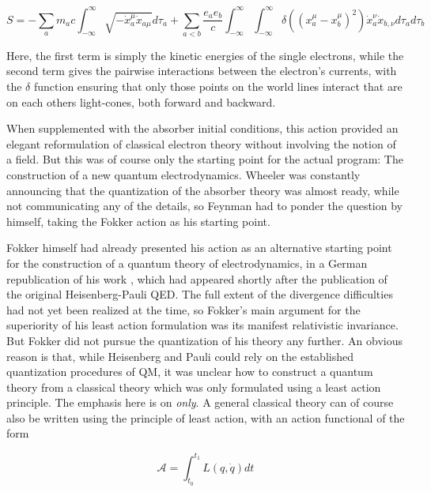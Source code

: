 \documentclass[12pt]{article}
\begin{document}
\begin{equation}
\label{eq:fokker}
S = - \sum_a m_a c \int_{-\infty}^{\infty} \sqrt{- \dot{x}_a^{\mu} \dot{x}_{a \mu}} d \tau_a + \sum_{a < b} \frac{e_a e_b}{c} \int_{-\infty}^{\infty} \int_{-\infty}^{\infty} \delta \left( \left( x_a^{\mu} - x_b^{\mu} \right)^2 \right) \dot{x}_a^{\nu} \dot{x}_{b,\nu} d \tau_a d \tau_b
\end{equation}

Here, the first term is simply the kinetic energies of the single electrons, while the second term gives the pairwise interactions between the electron's currents, with the $\delta$ function ensuring that only those points on the world lines interact that are on each others light-cones, both forward and backward.

When supplemented with the absorber initial conditions, this action provided an elegant reformulation of classical electron theory without involving the notion of a field. But this was of course only the starting point for the actual program: The construction of a new quantum electrodynamics. Wheeler was constantly announcing that the quantization of the absorber theory was almost ready, while not communicating any of the details, so Feynman had to ponder the question by himself, taking the Fokker action as his starting point.

Fokker himself had already presented his action as an alternative starting point for the construction of a quantum theory of electrodynamics, in a German republication of his work \citep{fokker_1929_ein-invarianter}, which had appeared shortly after the publication of the original Heisenberg-Pauli QED. The full extent of the divergence difficulties had not yet been realized at the time, so Fokker's main argument for the superiority of his least action formulation was its manifest relativistic invariance. But Fokker did not pursue the quantization of his theory any further. An obvious reason is that, while Heisenberg and Pauli could rely on the established quantization procedures of QM, it was unclear how to construct a quantum theory from a classical theory which was only formulated using a least action principle. The emphasis here is on \emph{only}. A general classical theory can of course also be written using the principle of least action, with an action functional of the form

\begin{equation}
\label{eq:action}
\mathcal{A} = \int_{t_0}^{t_1} L (q,\dot{q} ) dt
\end{equation}
\end{document}
